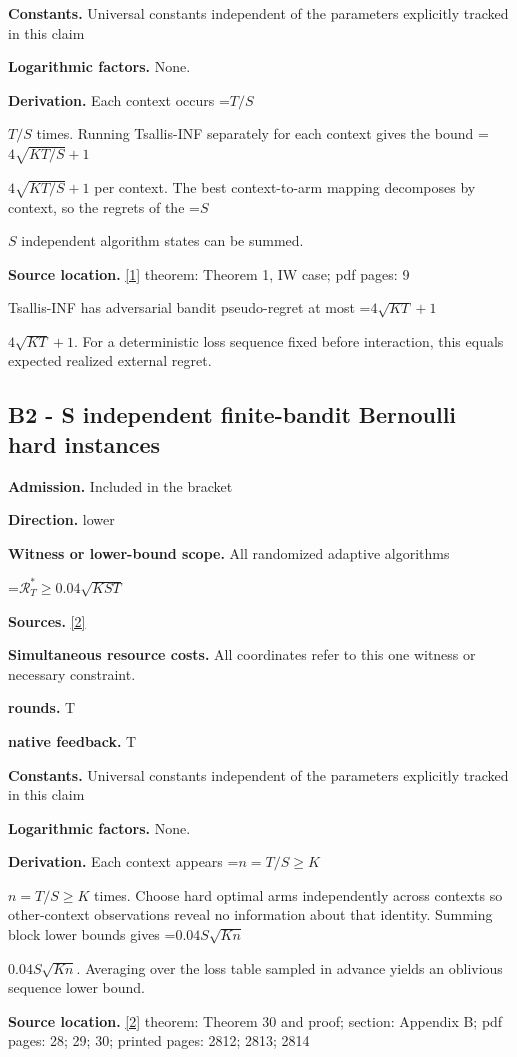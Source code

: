 \documentclass[10pt,a4paper]{article}
\newcommand{\AtlasMath}[1]{\par\begingroup\centering\setbox0=\hbox{$\displaystyle #1$}\ifdim\wd0>1.4\linewidth\typeout{ATLAS WIDE FORMULA: \the\wd0}\fi\ifdim\wd0>\linewidth\resizebox{\linewidth}{!}{\box0}\else\box0\fi\par\endgroup}
\newcommand{\AtlasInlineMath}[1]{\begingroup\setbox0=\hbox{$#1$}\ifdim\wd0>.4\linewidth\endgroup\AtlasMath{#1}\else\endgroup$#1$\fi}
\begin{document}
\textbf{Constants.} Universal constants independent of the parameters explicitly tracked in this claim

\textbf{Logarithmic factors.} None.

\textbf{Derivation.} Each context occurs \AtlasInlineMath{T/S} times. Running Tsallis-INF separately for each context gives the bound \AtlasInlineMath{4\sqrt{KT/S}+1} per context. The best context-to-arm mapping decomposes by context, so the regrets of the \AtlasInlineMath{S} independent algorithm states can be summed.

\textbf{Source location.} \href{https://jmlr.org/papers/volume22/19-753/19-753.pdf}{[1]} theorem: Theorem 1, IW case; pdf pages: 9

Tsallis-INF has adversarial bandit pseudo-regret at most \AtlasInlineMath{4\sqrt{KT}+1}. For a deterministic loss sequence fixed before interaction, this equals expected realized external regret.

\subsection{B2 - S independent finite-bandit Bernoulli hard instances}
\textbf{Admission.} Included in the bracket

\textbf{Direction.} lower

\textbf{Witness or lower-bound scope.} All randomized adaptive algorithms

\AtlasMath{\mathcal{R}_T^*\ge0.04\sqrt{KST}}
\textbf{Sources.} \href{https://jmlr.org/papers/volume11/audibert10a/audibert10a.pdf}{[2]}

\textbf{Simultaneous resource costs.} All coordinates refer to this one witness or necessary constraint.

\textbf{rounds.} T

\textbf{native feedback.} T

\textbf{Constants.} Universal constants independent of the parameters explicitly tracked in this claim

\textbf{Logarithmic factors.} None.

\textbf{Derivation.} Each context appears \AtlasInlineMath{n=T/S\ge K} times. Choose hard optimal arms independently across contexts so other-context observations reveal no information about that identity. Summing block lower bounds gives \AtlasInlineMath{0.04S\sqrt{Kn}}. Averaging over the loss table sampled in advance yields an oblivious sequence lower bound.

\textbf{Source location.} \href{https://jmlr.org/papers/volume11/audibert10a/audibert10a.pdf}{[2]} theorem: Theorem 30 and proof; section: Appendix B; pdf pages: 28; 29; 30; printed pages: 2812; 2813; 2814
\end{document}

